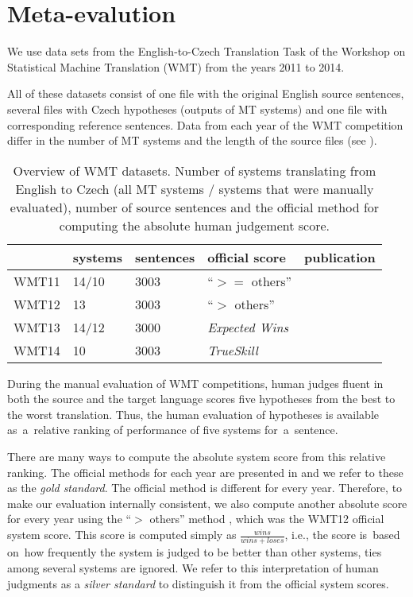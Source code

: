 \section{Meta-evalution}

We use data sets from the English-to-Czech Translation Task of the Workshop on
Statistical Machine Translation (WMT) from the years 2011 to 2014.

All of these datasets consist of one file with the original English source sentences,
several files with Czech hypotheses (outputs of MT systems) and one file with corresponding 
reference sentences. Data from each year of the WMT competition differ in the 
number of MT systems and the length of the source files (see ). 


\begin{table}[h]
\centering
\begin{tabular}{l|l|l|l|l}
      & systems & sentences & official score & publication\\
\hline
WMT11 & 14/10    & 3003      & “$ >= $ others”      & \cite{wmt11}  \\
WMT12 & 13          & 3003      & “$ > $ others”      & \cite{wmt12}  \\
WMT13 & 14/12    & 3000      & \textit{Expected Wins} & \cite{wmt13}  \\
WMT14 & 10          & 3003      & \textit{TrueSkill}   & \cite{wmt14}
\end{tabular}
\caption{Overview of WMT datasets. Number of systems translating from English 
to Czech (all MT systems / systems that were manually evaluated), number of 
source sentences and the official method for computing the absolute human 
judgement score.}
\label{wmt-data}
\end{table}

During the manual evaluation of WMT competitions, human judges fluent in both
the source and the target language scores five hypotheses from the best to
the worst translation. Thus, the human evaluation of hypotheses is available 
as~a~relative ranking of performance of five systems for~a~sentence. 

There are many ways to compute the absolute system score from this relative
ranking. The official methods for each year are presented in  
and we refer to these as the \textit{gold standard}. The official method is
different for every year. Therefore, to make our evaluation internally 
consistent, we also compute another absolute score for every year using the 
“$ >$ others” method \citep{bojar-grains}, which was the WMT12 official system
score. This score is computed simply as $\frac{wins}{wins+loses} $, i.e., the 
score is~based on~how frequently the system is judged to be better than 
other systems, ties among several systems are ignored. We refer to this 
interpretation of human judgments as a \textit{silver standard} to distinguish
it from the official system scores. %

